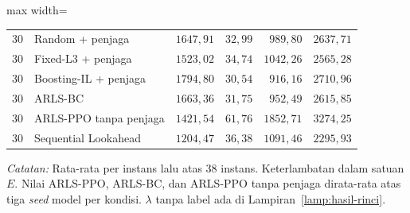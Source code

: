 \begin{table}[htbp]
\begin{adjustbox}{max width=\textwidth}
\begin{tabular}{llrrrr}
30 & Random + penjaga & $1647{,}91$ & $32{,}99$ & $989{,}80$ & $2637{,}71$ \\
30 & Fixed-L3 + penjaga & $1523{,}02$ & $34{,}74$ & $1042{,}26$ & $2565{,}28$ \\
30 & Boosting-IL + penjaga & $1794{,}80$ & $30{,}54$ & $916{,}16$ & $2710{,}96$ \\
30 & ARLS-BC & $1663{,}36$ & $31{,}75$ & $952{,}49$ & $2615{,}85$ \\
30 & ARLS-PPO tanpa penjaga & $1421{,}54$ & $61{,}76$ & $1852{,}71$ & $3274{,}25$ \\
30 & Sequential Lookahead & $1204{,}47$ & $36{,}38$ & $1091{,}46$ & $2295{,}93$ \\
\bottomrule
\end{tabular}
\end{adjustbox}
\par\smallskip\footnotesize\textit{Catatan:} Rata-rata per instans lalu atas 38 instans. Keterlambatan dalam satuan $E$. Nilai ARLS-PPO, ARLS-BC, dan ARLS-PPO tanpa penjaga dirata-rata atas tiga \emph{seed} model per kondisi. $\lambda$ tanpa label ada di Lampiran~\ref{lamp:hasil-rinci}.
\end{table}
